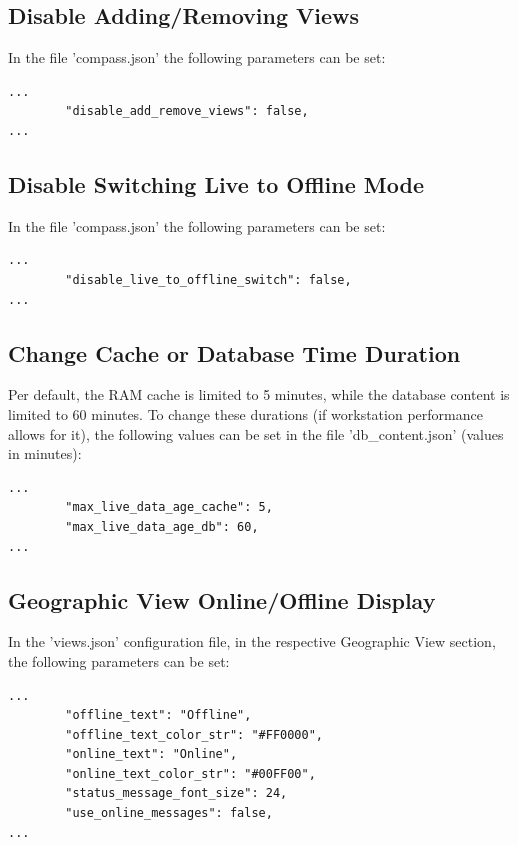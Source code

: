 \subsection{Disable Adding/Removing Views}

In the file 'compass.json' the following parameters can be set:

\begin{lstlisting}
...
        "disable_add_remove_views": false,
...        
\end{lstlisting}

\subsection{Disable Switching Live to Offline Mode}

In the file 'compass.json' the following parameters can be set:

\begin{lstlisting}
...
        "disable_live_to_offline_switch": false,
...        
\end{lstlisting}

\subsection{Change Cache or Database Time Duration}

Per default, the RAM cache is limited to 5 minutes, while the database content is limited to 60 minutes. To change these durations (if workstation performance allows for it), the following values can be set in the file 'db\_content.json' (values in minutes):

\begin{lstlisting}
...
        "max_live_data_age_cache": 5,
        "max_live_data_age_db": 60,
...        
\end{lstlisting}

\subsection{Geographic View Online/Offline Display}
\label{sec:live_online_offline}

In the 'views.json' configuration file, in the respective Geographic View section, the following parameters can be set:

\begin{lstlisting}
...
        "offline_text": "Offline",
        "offline_text_color_str": "#FF0000",
        "online_text": "Online",
        "online_text_color_str": "#00FF00",
        "status_message_font_size": 24,
        "use_online_messages": false,        
...        
\end{lstlisting}

